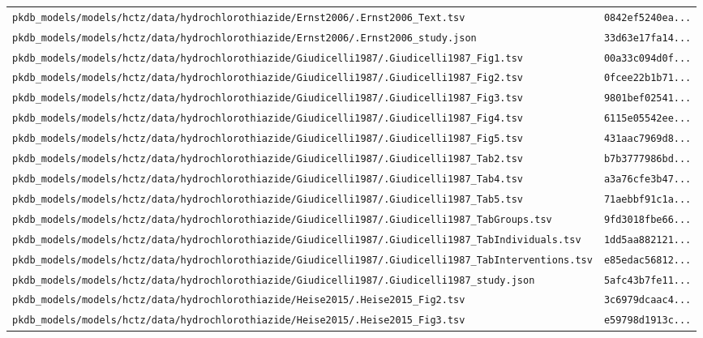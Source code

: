 \documentclass{article}
\begin{document}
\begin{longtable}{ll}
\texttt{pkdb\_models/models/hctz/data/hydrochlorothiazide/Ernst2006/.Ernst2006\_Text.tsv} & \texttt{0842ef5240ea...} \\
\texttt{pkdb\_models/models/hctz/data/hydrochlorothiazide/Ernst2006/.Ernst2006\_study.json} & \texttt{33d63e17fa14...} \\
\texttt{pkdb\_models/models/hctz/data/hydrochlorothiazide/Giudicelli1987/.Giudicelli1987\_Fig1.tsv} & \texttt{00a33c094d0f...} \\
\texttt{pkdb\_models/models/hctz/data/hydrochlorothiazide/Giudicelli1987/.Giudicelli1987\_Fig2.tsv} & \texttt{0fcee22b1b71...} \\
\texttt{pkdb\_models/models/hctz/data/hydrochlorothiazide/Giudicelli1987/.Giudicelli1987\_Fig3.tsv} & \texttt{9801bef02541...} \\
\texttt{pkdb\_models/models/hctz/data/hydrochlorothiazide/Giudicelli1987/.Giudicelli1987\_Fig4.tsv} & \texttt{6115e05542ee...} \\
\texttt{pkdb\_models/models/hctz/data/hydrochlorothiazide/Giudicelli1987/.Giudicelli1987\_Fig5.tsv} & \texttt{431aac7969d8...} \\
\texttt{pkdb\_models/models/hctz/data/hydrochlorothiazide/Giudicelli1987/.Giudicelli1987\_Tab2.tsv} & \texttt{b7b3777986bd...} \\
\texttt{pkdb\_models/models/hctz/data/hydrochlorothiazide/Giudicelli1987/.Giudicelli1987\_Tab4.tsv} & \texttt{a3a76cfe3b47...} \\
\texttt{pkdb\_models/models/hctz/data/hydrochlorothiazide/Giudicelli1987/.Giudicelli1987\_Tab5.tsv} & \texttt{71aebbf91c1a...} \\
\texttt{pkdb\_models/models/hctz/data/hydrochlorothiazide/Giudicelli1987/.Giudicelli1987\_TabGroups.tsv} & \texttt{9fd3018fbe66...} \\
\texttt{pkdb\_models/models/hctz/data/hydrochlorothiazide/Giudicelli1987/.Giudicelli1987\_TabIndividuals.tsv} & \texttt{1dd5aa882121...} \\
\texttt{pkdb\_models/models/hctz/data/hydrochlorothiazide/Giudicelli1987/.Giudicelli1987\_TabInterventions.tsv} & \texttt{e85edac56812...} \\
\texttt{pkdb\_models/models/hctz/data/hydrochlorothiazide/Giudicelli1987/.Giudicelli1987\_study.json} & \texttt{5afc43b7fe11...} \\
\texttt{pkdb\_models/models/hctz/data/hydrochlorothiazide/Heise2015/.Heise2015\_Fig2.tsv} & \texttt{3c6979dcaac4...} \\
\texttt{pkdb\_models/models/hctz/data/hydrochlorothiazide/Heise2015/.Heise2015\_Fig3.tsv} & \texttt{e59798d1913c...} \\

\end{longtable}
\end{document}
